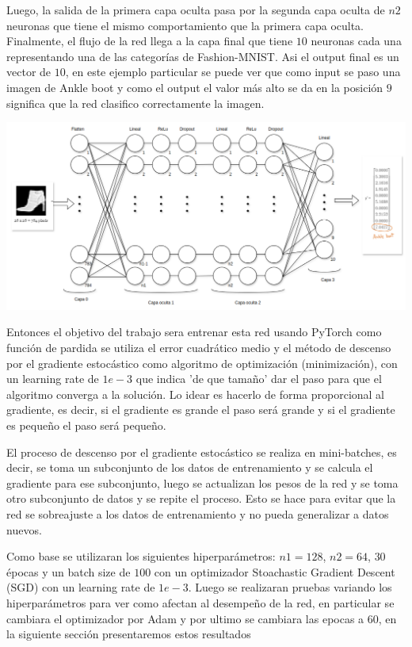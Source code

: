 \documentclass[aps,prl,reprint,groupedaddress]{revtex4-2}
\newenvironment{Figura}
  {\par\medskip\noindent\minipage{\linewidth}}
  {\endminipage\par\medskip}
\begin{document}
Luego, la salida de la primera capa oculta pasa por la segunda capa oculta de $n2$
neuronas que tiene el mismo comportamiento que la primera capa oculta. Finalmente,
el flujo de la red llega a la capa final que tiene $10$ neuronas cada una 
representando una de las categorías de Fashion-MNIST. Asi el output final es un 
vector de $10$, en este ejemplo particular se puede ver que como input se paso 
una imagen de Ankle boot y como el output el valor más alto se da en la posición
$9$ significa que la red clasifico correctamente la imagen.

\begin{Figura}
  \centering
  \includegraphics[width=1\textwidth]{figs/arq_model.png}
  \label{fig-red}
\end{Figura}

Entonces el objetivo del trabajo sera entrenar esta red usando PyTorch como 
función de pardida se utiliza el error cuadrático medio y el método de descenso 
por el gradiente estocástico como algoritmo de optimización (minimización), 
con un learning rate de $1e-3$ que indica 'de que tamaño' dar el paso 
para que el algoritmo converga a la solución. Lo idear es hacerlo de forma 
proporcional al gradiente, es decir, si el gradiente es grande el paso será
grande y si el gradiente es pequeño el paso será pequeño.

El proceso de descenso por el gradiente estocástico se realiza en mini-batches,
es decir, se toma un subconjunto de los datos de entrenamiento y se calcula el
gradiente para ese subconjunto, luego se actualizan los pesos de la red y se
toma otro subconjunto de datos y se repite el proceso. Esto se hace para evitar
que la red se sobreajuste a los datos de entrenamiento y no pueda generalizar
a datos nuevos.

Como base se utilizaran los siguientes hiperparámetros: $n1=128$, $n2=64$, 
$30$ épocas y un batch size de $100$ con un optimizador 
Stoachastic Gradient Descent (SGD) con un learning rate de $1e-3$. Luego se 
realizaran pruebas variando los hiperparámetros para ver como afectan al 
desempeño de la red, en particular se cambiara el optimizador por Adam y 
por ultimo se cambiara las epocas a $60$, en la siguiente sección presentaremos
estos resultados
\end{document}
